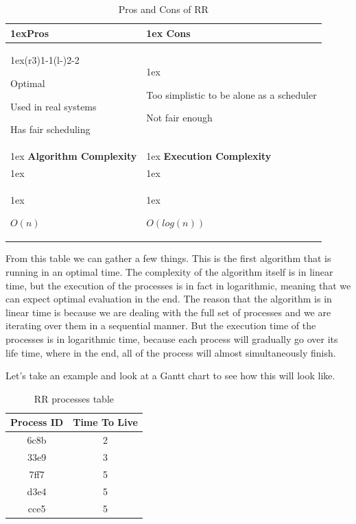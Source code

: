 \documentclass{article}
\begin{document}
\begin{table}[H]
  \begin{tabularx}{\linewidth}{>{\parskip1ex}X@{\kern4\tabcolsep}>{\parskip1ex}X}
    \toprule
    \hfil\bfseries Pros & \hfil\bfseries Cons \\
    \cmidrule(r{3\tabcolsep}){1-1}\cmidrule(l{-\tabcolsep}){2-2}

    Optimal\par
    Used in real systems\par
    Has fair scheduling\par

    &

    Too simplistic to be alone as a scheduler\par
    Not fair enough \\
    \bottomrule
    \toprule
    \hfil\bfseries Algorithm Complexity & \hfil\bfseries Execution Complexity \\

    \\
    \centerline{$O(n)$}\par

    &

    \centerline{$O(log(n))$}
  \end{tabularx}
  \caption{Pros and Cons of RR}
\end{table}

From this table we can gather a few things. This is the first algorithm that is running in an optimal time. The complexity of the algorithm itself is in linear time, but the execution of the processes is in fact in logarithmic, meaning that we can expect optimal evaluation in the end. The reason that the algorithm is in linear time is because we are dealing with the full set of processes and we are iterating over them in a sequential manner. But the execution time of the processes is in logarithmic time, because each process will gradually go over its life time, where in the end, all of the process will almost simultaneously finish.

Let's take an example and look at a Gantt chart to see how this will look like.

\begin{table}[H]
  \begin{center}
    \label{tab:RR processes}
    \begin{tabular}{c|c}
      \toprule
      \textbf{Process ID} & \textbf{Time To Live} \\
      \midrule
      6c8b & 2 \\
      33e9 & 3 \\
      7ff7 & 5 \\
      d3e4 & 5 \\
      cce5 & 5 \\
      \bottomrule
    \end{tabular}
    \caption{RR processes table}
  \end{center}
\end{table}
\end{document}
